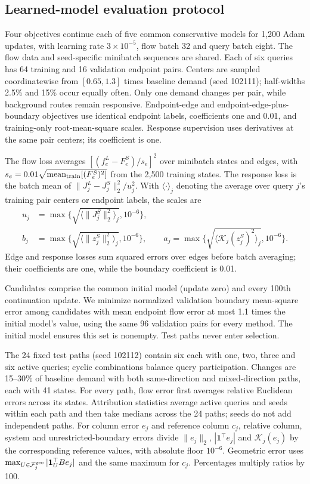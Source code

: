 \subsection{Learned-model evaluation protocol}\label{app:pairs-v102}
Four objectives continue each of five common conservative models for 1,200 Adam
updates, with learning rate $3\times10^{-5}$, flow batch 32 and query batch eight.
The flow data and seed-specific minibatch sequences are shared. Each of six
queries has 64 training and 16 validation endpoint pairs. Centers are sampled
coordinatewise from $[0.65,1.3]$ times baseline demand (seed 102111);
half-widths 2.5\% and 15\% occur equally often. Only one demand changes per
pair, while background routes remain responsive. Endpoint-edge and
endpoint-edge-plus-boundary objectives use identical endpoint labels, coefficients
one and 0.01, and training-only root-mean-square scales. Response supervision
uses derivatives at the same pair centers; its coefficient is one.

The flow loss averages $[(f_e^L-F_e^S)/s_e]^2$ over minibatch states and edges, with $s_e=0.01\sqrt{\operatorname{mean}_{\rm train}[(F_e^S)^2]}$ from the 2,500 training states. The response loss is the batch mean of $\|J_j^L-J_j^S\|_2^2/u_j^2$. With $\langle\cdot\rangle_j$ denoting the average over query $j$'s training pair centers or endpoint labels, the scales are
\[
\begin{aligned}
u_j&=\max\{\sqrt{\langle\|J_j^S\|_2^2\rangle_j},10^{-6}\},\\
b_j&=\max\{\sqrt{\langle\|z_j^S\|_2^2\rangle_j},10^{-6}\},\qquad
a_j=\max\{\sqrt{\langle\mathcal K_j(z_j^S)^2\rangle_j},10^{-6}\}.
\end{aligned}
\]
Edge and response losses sum squared errors over edges before batch averaging; their coefficients are one, while the boundary coefficient is 0.01.

Candidates comprise the common initial model (update zero) and every 100th
continuation update. We minimize normalized validation boundary mean-square
error among candidates with mean endpoint flow error at most 1.1 times the
initial model's value, using the same 96 validation pairs for every method.
The initial model ensures this set is nonempty. Test paths never enter selection.

The 24 fixed test paths (seed 102112) contain six each with one, two, three and
six active queries; cyclic combinations balance query participation. Changes
are 15--30\% of baseline demand with both same-direction and mixed-direction
paths, each with 41 states. For every path, flow error first averages relative
Euclidean errors across its states. Attribution statistics average active
queries and seeds within each path and then take medians across the 24 paths;
seeds do not add independent paths. For column error $e_j$ and reference column
$c_j$, relative column, system and unrestricted-boundary errors divide
$\|e_j\|_2$, $|\mathbf1^\top e_j|$ and $\mathcal K_j(e_j)$ by the
corresponding reference values, with absolute floor $10^{-6}$. Geometric error
uses $\max_{U\in\mathcal F_j^{\rm geo}}|\mathbf1_U^\top Be_j|$ and
the same maximum for $c_j$. Percentages multiply ratios by 100.

